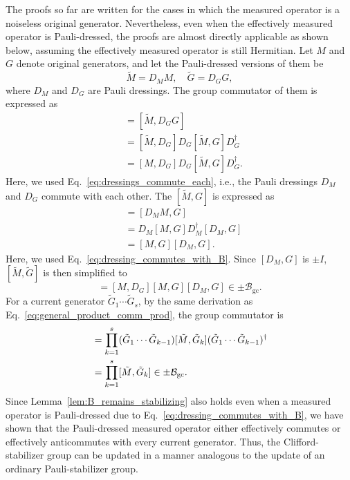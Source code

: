 \documentclass[
 reprint,
 amsmath,amssymb,
 pra,superscriptaddress, nofootinbib
]{revtex4-2}
\theoremstyle{definition}
\theoremstyle{plain}
\begin{document}
The proofs so far are written for the cases in which the measured operator is a noiseless original generator.
Nevertheless, even when the effectively measured operator is Pauli-dressed, the proofs are almost directly applicable as shown below, assuming the effectively measured operator is still Hermitian.
Let $M$ and $G$ denote original generators, and let the Pauli-dressed versions of them be
\begin{equation}
  \tilde M = D_M M, \quad \tilde G = D_G G,
  \label{eq:dressed_version}
\end{equation}
where $D_M$ and $D_G$ are Pauli dressings.
The group commutator of them is expressed as
\begin{align}
  [\tilde M,\tilde G]
  &=
  [\tilde M,D_GG] \\
  &=
  [\tilde M,D_G]D_G[\tilde M,G]D_G^\dagger\\
  &=
  [M,D_G]D_G[\tilde M,G]D_G^\dagger.
  \label{eq:meas-frame-dressed-gen-comm-1}
\end{align}
Here, we used Eq.~\eqref{eq:dressings_commute_each}, i.e., the Pauli dressings $D_M$ and $D_G$ commute with each other.
The $[\tilde M,G]$ is expressed as
\begin{align}
  [\tilde M,G]
  &=
  [D_MM,G] \\
  &=
  D_M[M,G]D_M^\dagger[D_M,G]\\
  &=
  [M,G][D_M,G].
  \label{eq:meas-frame-dressed-gen-comm-2}
\end{align}
Here, we used Eq.~\eqref{eq:dressing_commutes_with_B}.
Since $[D_M,G]$ is $\pm I$, $[\tilde M,\tilde G]$ is then simplified to 
\begin{equation}
  [\tilde M,\tilde G]=[M,D_G][M,G][D_M,G] \in \pm \mathcal{B}_{\mathrm{gc}}.
  \label{eq:dressed-meas-dressed-gen-in-Bgc}
\end{equation}
For a current generator $\tilde G_1\cdots \tilde G_s$, by the same derivation as Eq.~\eqref{eq:general_product_comm_prod}, the group commutator is
\begin{align}
  [\tilde M,
    \tilde G_1\cdots \tilde G_s]
  &=
  \prod_{k=1}^{s}
  (\tilde G_1 \cdots \tilde G_{k-1})
  [\tilde M,\tilde G_k]
  (\tilde G_1 \cdots \tilde G_{k-1})^\dagger\\
  &=
  \prod_{k=1}^{s}
  [\tilde M,\tilde G_k]\in \pm\mathcal B_{\rm gc}.
  \label{eq:measured_conju_group}
\end{align}
Since Lemma~\ref{lem:B_remains_stabilizing} also holds even when a measured operator is Pauli-dressed due to Eq.~\eqref{eq:dressing_commutes_with_B}, we have shown that the Pauli-dressed measured operator either effectively commutes or effectively anticommutes with every current generator. Thus, the Clifford-stabilizer group can be updated in a manner analogous to the update of an ordinary Pauli-stabilizer group.
\end{document}
